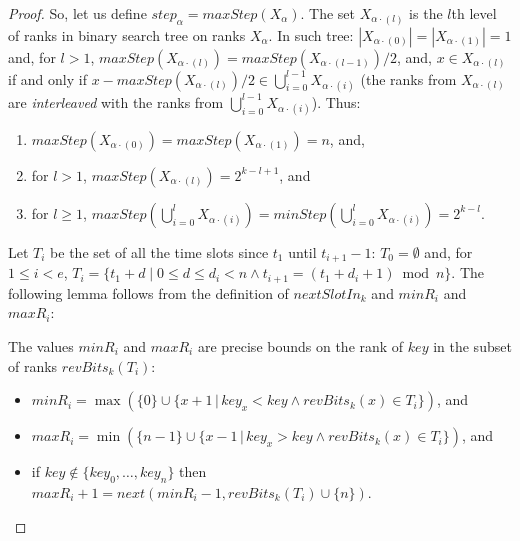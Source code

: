 \documentclass{llncs}
\begin{document}
\begin{proof}
So, let us define $step_\alpha=maxStep(X_\alpha)$. 
The %
set $X_{\alpha\cdot(l)}$ is the $l$th level of ranks in binary search tree on ranks
$X_{\alpha}$. 
In such tree:
$|X_{\alpha\cdot(0)}|=|X_{\alpha\cdot(1)}|=1$ and, 
for $l>1$, $maxStep(X_{\alpha\cdot(l)})=maxStep(X_{\alpha\cdot(l-1)})/2$,
and, $x\in X_{\alpha\cdot(l)}$ if and only if 
$x-maxStep(X_{\alpha\cdot(l)})/2 \in  \bigcup_{i=0}^{l-1} X_{\alpha\cdot(i)}$
(the ranks from $X_{\alpha\cdot(l)}$ are {\em interleaved} with the ranks from $\bigcup_{i=0}^{l-1} X_{\alpha\cdot(i)}$).
Thus:
\begin{lemma}\label{step-lemma2}
\begin{enumerate}
\item
  $maxStep(X_{\alpha\cdot(0)})=maxStep(X_{\alpha\cdot(1)})=n$, and,
\item
  for $l>1$, $maxStep\left(X_{\alpha\cdot(l)}\right)=2^{k-l+1}$, and
\item\label{step-lemma2-interleaving}
  for $l\ge 1$, $maxStep(\bigcup_{i=0}^{l} X_{\alpha\cdot(i)})=minStep(\bigcup_{i=0}^{l} X_{\alpha\cdot(i)})=2^{k-l}$.
\end{enumerate}
\end{lemma}

Let $T_i$ be the set of all the time slots since $t_1$ until $t_{i+1}-1$:
$T_0=\emptyset$ and, 
for $1\le i<e$, $T_i=\{t_1+d\;|\; 0\le d\le d_i<n \wedge t_{i+1}=(t_1+d_i+1)\bmod n\}$.
The following lemma follows from the definition of $nextSlotIn_k$ and $minR_i$ and $maxR_i$:

\begin{lemma}\label{complete-bounds-lemma}
The values $minR_i$ and $maxR_i$ are precise bounds on the rank of $key$
in the subset of ranks $revBits_k(T_i)$:
\begin{itemize}
\item 
$minR_i=\max \left(\{0\}\cup \{x+1\,|\, key_x<key \wedge revBits_k(x)\in T_i\}\right)$, and  
\item 
$maxR_i=\min \left(\{n-1\}\cup \{x-1\,|\, key_x>key \wedge revBits_k(x)\in T_i\}\right)$, and %
\item
if $key\not\in\{key_0,\ldots,key_n\}$ then $maxR_i+1=next(minR_i-1, revBits_k(T_i)\cup \{n\})$.
\end{itemize}
\end{lemma}



\end{proof}
\end{document}
